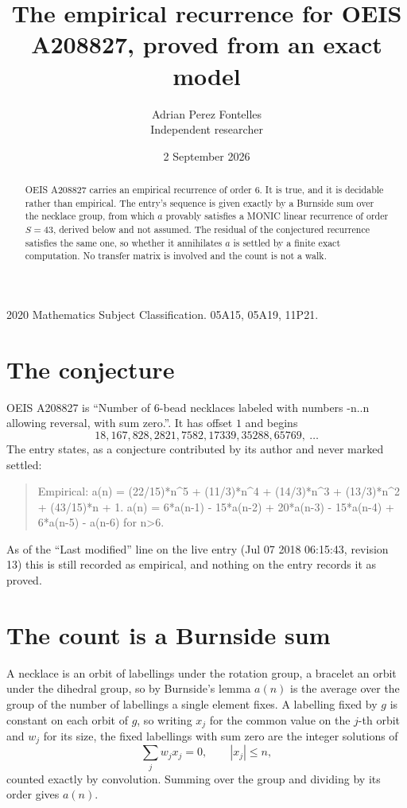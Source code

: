 \documentclass[11pt,a4paper]{article}
\title{The empirical recurrence for OEIS A208827, proved from an exact model}
\author{Adrian Perez Fontelles\\ \small Independent researcher}
\date{2 September 2026}
\theoremstyle{plain}
\theoremstyle{definition}
\begin{document}
\maketitle

\begin{abstract}
OEIS A208827 carries an empirical recurrence of order $6$. It is true, and it is
decidable rather than empirical. The entry's sequence is given exactly by a Burnside sum over the necklace group, from
which $a$ provably satisfies a MONIC linear recurrence of order $S=43$, derived below and not
assumed. The residual of the conjectured recurrence satisfies the same one, so whether it
annihilates $a$ is settled by a finite exact computation. No transfer matrix is involved and
the count is not a walk.
\end{abstract}

\noindent\small 2020 Mathematics Subject Classification. 05A15, 05A19, 11P21.\normalsize

\section{The conjecture}

OEIS A208827 is ``Number of 6-bead necklaces labeled with numbers -n..n allowing reversal, with sum zero.''. It has offset $1$ and begins
\[
18, 167, 828, 2821, 7582, 17339, 35288, 65769,\ \dots
\]
The entry states, as a conjecture contributed by its author and never marked settled:
\begin{quote}
Empirical: a(n) = (22/15)*n\^{}5 + (11/3)*n\^{}4 + (14/3)*n\^{}3 + (13/3)*n\^{}2 + (43/15)*n + 1. a(n) = 6*a(n-1) - 15*a(n-2) + 20*a(n-3) - 15*a(n-4) + 6*a(n-5) - a(n-6) for n>6.
\end{quote}
As of the ``Last modified'' line on the live entry (Jul 07 2018 06:15:43, revision 13)
this is still recorded as empirical, and nothing on the entry records it as proved.

\section{The count is a Burnside sum}

A necklace is an orbit of labellings under the rotation group, a bracelet an orbit under the
dihedral group, so by Burnside's lemma $a(n)$ is the average over the group of the number of
labellings a single element fixes. A labelling fixed by $g$ is constant on each orbit of $g$,
so writing $x_j$ for the common value on the $j$-th orbit and $w_j$ for its size, the fixed
labellings with sum zero are the integer solutions of
\[
\sum_j w_jx_j = 0,\qquad |x_j|\le n,
\]
counted exactly by convolution. Summing over the group and dividing by its order gives $a(n)$.
\end{document}
